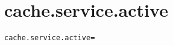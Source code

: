 \section{cache.service.active}
\label{configuration:CacheServiceActive}
\AvailableInCsharpOnly{\TODO}
\begin{lstlisting}[style=Props,caption={Usage example for \textit{cache.service.active}}]
cache.service.active=
\end{lstlisting}